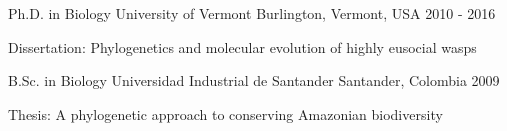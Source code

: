 {\color{awesome}\faUniversity}


\begin{cventries}

  \cventry
    {Ph.D. in Biology} %
    {University of Vermont} %
    {Burlington, Vermont, USA} %
    {2010 - 2016} %
    {
      \begin{cvitems} %
        \item {Dissertation: Phylogenetics and molecular evolution of highly eusocial wasps}
      \end{cvitems}
    }

  \cventry
    {B.Sc. in Biology} %
    {Universidad Industrial de Santander} %
    {Santander, Colombia} %
    {2009} %
    {
      \begin{cvitems} %
        \item {Thesis: A phylogenetic approach to conserving Amazonian biodiversity}
      \end{cvitems}
    }
    
\end{cventries}